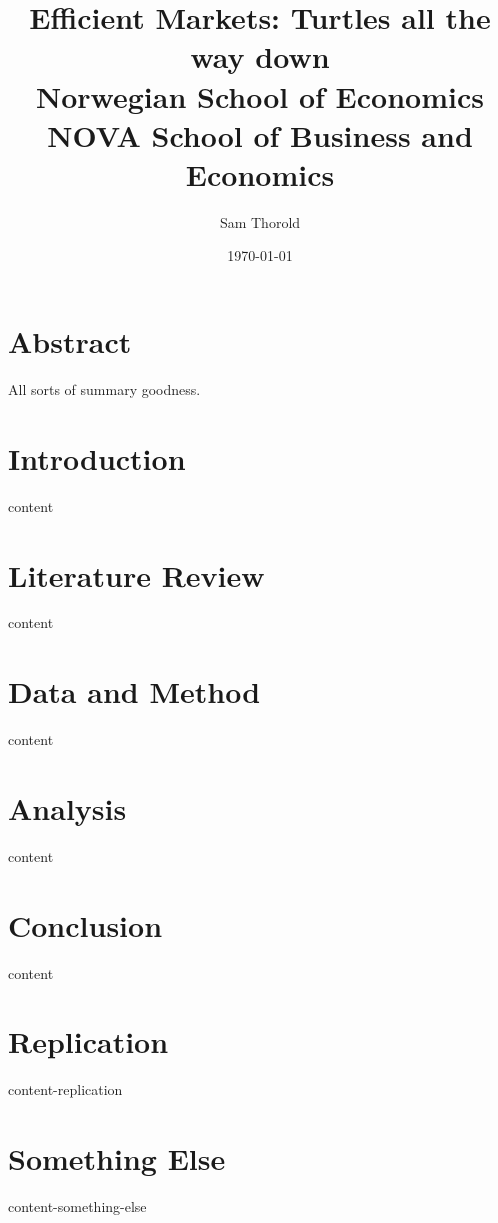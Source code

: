 \documentclass[a4paper]{report}
\title{
  {Efficient Markets: Turtles all the way down}\\
  {\large Norwegian School of Economics}\\
  {\large NOVA School of Business and Economics}
}
\author{Sam Thorold}
\date{\today}
\begin{document}
\maketitle

\chapter*{Abstract}

All sorts of summary goodness.

\tableofcontents

\chapter{Introduction} \label{ch:Intro}
{content}

\chapter{Literature Review} \label{ch:LitRev}
{content}

\chapter{Data and Method} \label{ch:DataMethod}
{content}

\chapter{Analysis} \label{ch:Analysis}
{content}

\chapter{Conclusion} \label{ch:Conclusion}
{content}

\appendix

\chapter{Replication} \label{ch:AppendixRepl}
{content-replication}

\chapter{Something Else} \label{ch:AppendixB}
{content-something-else}

\printbibliography
\end{document}
